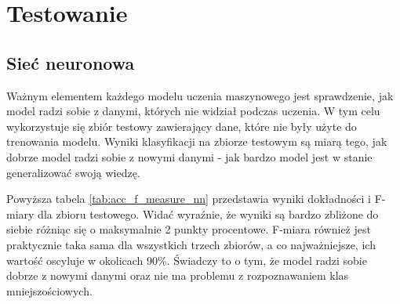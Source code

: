 \section{Testowanie}\label{sec:testowanie}
\subsection{Sieć neuronowa}\label{subsec:testowanie_siec_neuronowa}
Ważnym elementem każdego modelu uczenia maszynowego jest sprawdzenie, jak model radzi sobie z danymi, których nie widział podczas uczenia.
W tym celu wykorzystuje się zbiór testowy zawierający dane, które nie były użyte do trenowania modelu.
Wyniki klasyfikacji na zbiorze testowym są miarą tego, jak dobrze model radzi sobie z nowymi danymi - jak bardzo model jest w stanie generalizować swoją wiedzę.
\begin{table}[H]
    \centering
    \caption{Dokładność i F-miara dla zbioru testowego po 40 epokach}
    \label{tab:acc_f_measure_nn}
\end{table}
Powyższa tabela \ref{tab:acc_f_measure_nn} przedstawia wyniki dokładności i F-miary dla zbioru testowego. Widać wyraźnie, że wyniki są bardzo zbliżone do siebie różniąc się o maksymalnie 2 punkty procentowe.
F-miara również jest praktycznie taka sama dla wszystkich trzech zbiorów, a co najważniejsze, ich wartość oscyluje w okolicach 90\%. Świadczy to o tym, że model radzi sobie dobrze z nowymi danymi oraz
nie ma problemu z rozpoznawaniem klas mniejszościowych.
